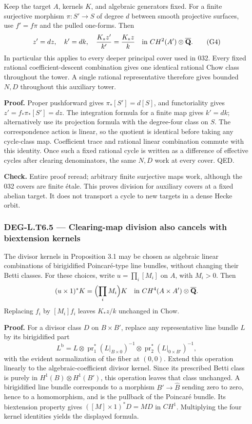 \documentclass[11pt,a4paper]{article}
\theoremstyle{definition}
\begin{document}
Keep the target \(A\), kernels \(K\), and algebraic generators fixed. For a finite surjective morphism \(\pi:S'\to S\) of degree \(d\) between smooth projective surfaces, use \(f'=f\pi\) and the pulled one-forms. Then \[
z'=d z,\quad k'=d k,\quad {K_*z'\over k'}={K_*z\over k}
\quad\hbox{in }CH^2(A')\otimes\overline{\mathbf Q}.
\tag{G4}
\] In particular this applies to every deeper principal cover used in 032. Every fixed rational coefficient-descent combination gives one identical rational Chow class throughout the tower. A single rational representative therefore gives bounded \(N,D\) throughout this auxiliary tower.

\textbf{Proof.} Proper pushforward gives \(\pi_*[S']=d[S]\), and functoriality gives \(z'=f_*\pi_*[S']=dz\). The integration formula for a finite map gives \(k'=dk\); alternatively use its projection formula with the degree-four class on \(S\). The correspondence action is linear, so the quotient is identical before taking any cycle-class map. Coefficient trace and rational linear combination commute with this identity. Once such a fixed rational cycle is written as a difference of effective cycles after clearing denominators, the same \(N,D\) work at every cover. QED.

\textbf{Check.} Entire proof reread; arbitrary finite surjective maps work, although the 032 covers are finite étale. This proves division for auxiliary covers at a fixed abelian target. It does not transport a cycle to new targets in a dense Hecke orbit.

\subsubsection{DEG-L.T6.5 --- Clearing-map division also cancels with biextension kernels}\label{DEG-L.T6.5}

The divisor kernels in Proposition 3.1 may be chosen as algebraic linear combinations of birigidified Poincaré-type line bundles, without changing their Betti classes. For these choices, write \(u=\prod_i[M_i]\) on \(A\), with \(M_i>0\). Then \[
(u\times1)^*K=\Bigl(\prod_i M_i\Bigr)K
\quad\hbox{in }CH^4(A\times A')\otimes\overline{\mathbf Q}.
\] Replacing \(f_i\) by \([M_i]f_i\) leaves \(K_*z/k\) unchanged in Chow.

\textbf{Proof.} For a divisor class \(D\) on \(B\times B'\), replace any representative line bundle \(L\) by its birigidified part \[
L^{\mathrm b}=L\otimes\operatorname{pr}_1^*(L|_{B\times0})^{-1}
\otimes\operatorname{pr}_2^*(L|_{0\times B'})^{-1},
\] with the evident normalization of the fiber at \((0,0)\). Extend this operation linearly to the algebraic-coefficient divisor kernel. Since its prescribed Betti class is purely in \(H^1(B)\otimes H^1(B')\), this operation leaves that class unchanged. A birigidified line bundle corresponds to a morphism \(B'\to\widehat B\) sending zero to zero, hence to a homomorphism, and is the pullback of the Poincaré bundle. Its biextension property gives \(([M]\times1)^*D=M D\) in \(CH^1\). Multiplying the four kernel identities yields the displayed formula.
\end{document}
